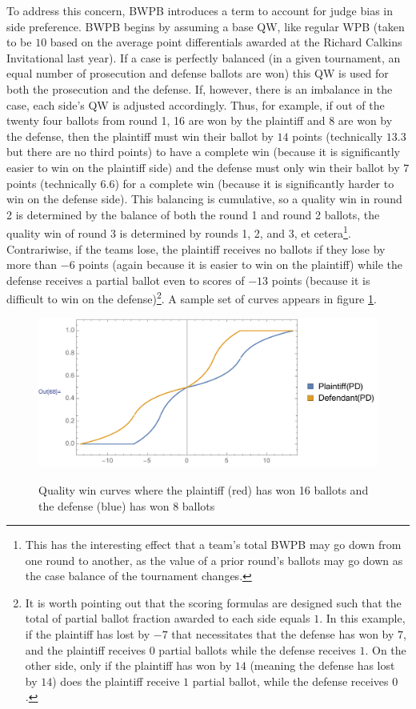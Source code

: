 \documentclass{article}
\begin{document}
To address this concern, BWPB introduces a term to account for judge bias in side preference.  BWPB begins by assuming a base QW, like regular WPB (taken to be $10$ based on the average point differentials awarded at the Richard Calkins Invitational last year).  If a case is perfectly balanced (in a given tournament, an equal number of prosecution and defense ballots are won) this QW is used for both the prosecution and the defense.  If, however, there is an imbalance in the case, each side's QW is adjusted accordingly.  Thus, for example, if out of the twenty four ballots from round 1, 16 are won by the plaintiff and 8 are won by the defense, then the plaintiff must win their ballot by $14$ points (technically $13.3$ but there are no third points) to have a complete win (because it is significantly easier to win on the plaintiff side) and the defense must only win their ballot by $7$ points (technically 6.6) for a complete win (because it is significantly harder to win on the defense side).  This balancing is cumulative, so a quality win in round 2 is determined by the balance of both the round 1 and round 2 ballots, the quality win of round 3 is determined by rounds 1, 2, and 3, et cetera\footnote{This has the interesting effect that a team's total BWPB may go down from one round to another, as the value of a prior round's ballots may go down as the case balance of the tournament changes.}.  Contrariwise, if the teams lose, the plaintiff receives no ballots if they lose by more than $-6$ points (again because it is easier to win on the plaintiff) while the defense receives a partial ballot even to scores of $-13$ points (because it is difficult to win on the defense)\footnote{It is worth pointing out that the scoring formulas are designed such that the total of partial ballot fraction awarded to each side equals $1$.  In this example, if the plaintiff has lost by $-7$ that necessitates that the defense has won by $7$, and the plaintiff receives $0$ partial ballots while the defense receives $1$.  On the other side, only if the plaintiff has won by $14$ (meaning the defense has lost by $14$) does the plaintiff receive $1$ partial ballot, while the defense receives $0$.}.  A sample set of curves appears in figure \ref{balancingCurve}.
\begin{figure}
\begin{center}
\label{balancingCurve}
\includegraphics{BalancingCurve}
\caption{Quality win curves where the plaintiff (red) has won 16 ballots and the defense (blue) has won 8 ballots}
\end{center}
\end{figure}
\end{document}

